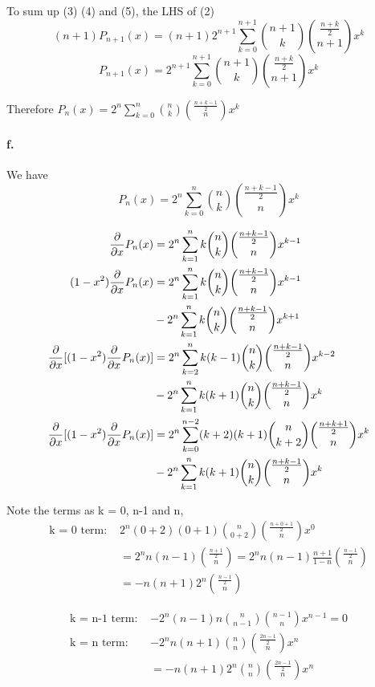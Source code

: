 \documentclass{article}
\begin{document}
To sum up (3) (4) and (5), the LHS of (2)
$$  (n+1)P_{n+1}(x) =(n+1) 2^{n+1} \sum_{k=0}^{n+1} \binom{n+1}{k} \binom{\frac{n+k}{2}}{n+1} x^k $$
$$  P_{n+1}(x) = 2^{n+1} \sum_{k=0}^{n+1} \binom{n+1}{k} \binom{\frac{n+k}{2}}{n+1} x^k $$

Therefore $ P_n (x) = 2^n \sum_{k=0}^n \binom{n}{k} \binom{\frac{n+k-1}{2}}{n} x^k$

\paragraph{f.}
We have
$$ P_n (x) = 2^n \sum_{k=0}^n \binom{n}{k} \binom{\frac{n+k-1}{2}}{n} x^k$$

\begin{equation}
  \begin{split}
    \pdv{}{x}  P_n (x) &= 2^n \sum_{k=1}^n k \binom{n}{k} \binom{\frac{n+k-1}{2}}{n} x^{k-1}\\
    (1-x^2)\pdv{}{x}  P_n (x) &= 2^n \sum_{k=1}^n k \binom{n}{k} \binom{\frac{n+k-1}{2}}{n} x^{k-1}\\
    &-2^n \sum_{k=1}^n k \binom{n}{k} \binom{\frac{n+k-1}{2}}{n} x^{k+1}\\
    \pdv{}{x} [(1-x^2)\pdv{}{x}  P_n (x) ]& = 2^n \sum_{k=2}^n k (k-1)\binom{n}{k} \binom{\frac{n+k-1}{2}}{n} x^{k-2}\\
    &-2^n \sum_{k=1}^n k (k+1) \binom{n}{k} \binom{\frac{n+k-1}{2}}{n} x^{k}\\
    \pdv{}{x} [(1-x^2)\pdv{}{x}  P_n (x) ]& = 2^n \sum_{k=0}^{n-2} (k+2) (k+1)\binom{n}{k+2} \binom{\frac{n+k+1}{2}}{n} x^{k}\\
    &-2^n \sum_{k=1}^n k (k+1) \binom{n}{k} \binom{\frac{n+k-1}{2}}{n} x^{k}\\
  \end{split}
\end{equation}

Note the terms as k = 0, n-1 and n,
\begin{equation}
  \begin{split}
    \text{k = 0 term: } &2^n (0+2) (0+1)\binom{n}{0+2} \binom{\frac{n+0+1}{2}}{n} x^{0}\\
    &= 2^n n(n-1) \binom{\frac{n+1}{2}}{n} = 2^n n(n-1) \frac{n+1}{1-n}\binom{\frac{n-1}{2}}{n}\\
    &= - n(n+1) 2^n \binom{\frac{n-1}{2}}{n}
  \end{split}
\end{equation}

\begin{equation}
  \begin{split}
    \text{k = n-1 term: }   &-2^n (n-1)n \binom{n}{n-1} \binom{n-1}{n} x^{n-1} = 0\\
    \text{k = n term: }   &-2^n n (n+1) \binom{n}{n} \binom{\frac{2n-1}{2}}{n} x^{n}\\
    &= - n (n+1) 2^n  \binom{n}{n} \binom{\frac{2n-1}{2}}{n} x^{n}\\
  \end{split}
\end{equation}
\end{document}

